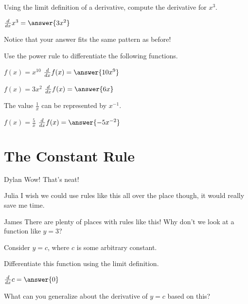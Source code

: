 \documentclass{ximera}
\begin{document}
\begin{question}
Using the limit definition of a derivative, compute the derivative for $x^3$.

$\frac{d}{dx} x^3 =  \answer{3x^2}$
\begin{feedback}[correct]
Notice that your answer fits the same pattern as before!
\end{feedback}
\end{question}

\begin{question}
Use the power rule to differentiate the following functions.

$f(x) = x^{10}$ \hspace{11mm} $\ddx f(x) = \answer{10x^9}$

$f(x) = 3x^2$ \hspace{10mm} $\ddx f(x) = \answer{6x}$

\begin{hint}
The value $\frac{1}{x}$ can be represented by $x^{-1}$.
\end{hint}
$f(x) = \frac{5}{x}$ \hspace{12mm} $\frac{d}{dx}f(x) = \answer{-5x^{-2}}$
\end{question}

\section{The Constant Rule}
\begin{dialogue}
\item[Dylan] Wow! That's neat!
\item[Julia] I wish we could use rules like this all over the place though, it would really save me time.
\item[James] There are plenty of places with rules like this! Why don't we look at a function like $y = 3$?
\end{dialogue}

Consider $y = c$, where $c$ is some arbitrary constant.
\begin{question}
\item{Differentiate this function using the limit definition.}

$ \frac{d}{dx} c =  \answer{0}$

What can you generalize about the derivative of $y=c$ based on this?
\begin{multipleChoice}
\end{multipleChoice}
\end{question}
\end{document}
